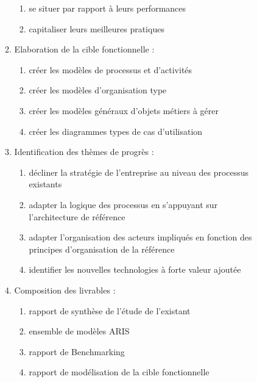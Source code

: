 \begin{enumerate}
\begin{description}
\begin{enumerate}
\begin{enumerate}
                  \item se situer par rapport à leurs performances
                  \item capitaliser leurs meilleures pratiques
                \end{enumerate}
            \item Elaboration de la cible fonctionnelle : 
                \begin{enumerate}
                  \item créer les modèles de processus et d'activités
                  \item créer les modèles d'organisation type
                  \item créer les modèles généraux d'objets métiers à gérer
                  \item créer les diagrammes types de cas d'utilisation
                \end{enumerate}
            \item Identification des thèmes de progrès : 
                \begin{enumerate}
                  \item décliner la stratégie de l'entreprise au niveau des processus existants 
                  \item adapter la logique des processus en s'appuyant sur l'architecture de référence
                  \item adapter l'organisation des acteurs impliqués en fonction des principes d'organisation de la référence
                  \item identifier les nouvelles technologies à forte valeur ajoutée
                \end{enumerate}
            \item Composition des livrables : 
                \begin{enumerate}
                  \item rapport de synthèse de l'étude de l'existant
                  \item ensemble de modèles ARIS 
                  \item rapport de Benchmarking
                  \item rapport de modélisation de la cible fonctionnelle
                \end{enumerate}
          \end{enumerate}

    \end{description}

\end{enumerate}